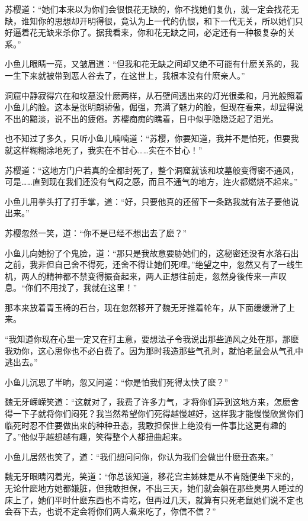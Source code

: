 \documentclass[12pt,oneside]{book}
\begin{document}
苏樱道：``她们本来以为你们会很恨花无缺的，你不找她们复仇，就一定会找花无缺，谁知你的思想却开明得很，竟认为上一代的仇恨，和下一代无关，所以她们只好逼着花无缺来杀你了。据我看来，你和花无缺之间，必定还有一种极复杂的关系。''

小鱼儿眼睛一亮，又皱眉道：``但我和花无缺之间却又绝不可能有什麽关系的，我一生下来就被带到恶人谷去了，在这世上，我根本没有什麽亲人。''

洞窟中静寂得穴在和坟墓没什麽两样，从石壁间透出来的灯光很柔和，月光般照着小鱼儿的脸。这本是张明朗骄傲，倔强，充满了魅力的脸，但现在看来，却显得说不出的黯淡，说不出的疲倦。苏樱痴痴的瞧着，目中似乎隐隐泛起了泪光。

也不知过了多久，只听小鱼儿喃喃道：``苏樱，你要知道，我并不是怕死，但要我就这样糊糊涂地死了，我实在不甘心\ldots\ldots 实在不甘心！''

苏樱道：``这地方门户若真的全都封死了，整个洞窟就该和坟墓般变得密不通风，可是\ldots\ldots 直到现在我们还没有气闷之感，而且不通气的地方，连火都燃烧不起来。''

小鱼儿用拳头打了打手掌，道：``好，只要他真的还留下一条路我就有法子要他说出来。''

苏樱忽然一笑，道：``你不是已经不想出去了麽？''

小鱼儿向她扮了个鬼脸，道：``那只是我故意要胁她们的，这秘密还没有水落石出之前，我非但自己舍不得死，还舍不得让她们死哩。''绝望之中，忽然又有了一线生机，两人的精神都不禁变得振奋起来，两人正想往前走，忽然身後传来一声叹息。``你们不用找了，我就在这里！''

那本来放着青玉椅的石台，现在忽然移开了魏无牙推着轮车，从下面缓缓滑了上来。

``我知道你现在心里一定又在打主意，要想法子令我说出那些通风之处在那，那麽我劝你，这心思你也不必白费了。因为那时我造那些气孔时，就怕老鼠会从气孔中逃出去。''

小鱼儿沉思了半晌，忽又问道：``你是怕我们死得太快了麽？''

魏无牙嵘嵘笑道：``这就对了，我费了许多力气，才将你们弄到这地方来，怎麽舍得一下子就将你们闷死？我当然希望你们死得越慢越好，这样我才能慢慢欣赏你们临死时忍不住要做出来的种种丑态，我敢担保世上绝没有一件事比这更有趣的了。''他似乎越想越有趣，笑得整个人都扭曲起来。

小鱼儿居然也笑了，道：``我们想问问你，你认为我们会做出什麽丑态来。''

魏无牙眼睛闪着光，笑道：``你总该知道，移花宫主姊妹是从不肯随便坐下来的，无论什麽地方她都嫌脏，但我敢担保，不出三天，她们就会躺在那些臭男人睡过的床上了，她们平时什麽东西也不肯吃，但再过几天，就算有只死老鼠她们说不定也会吞下去，也说不定会将你们两人煮来吃了，你信不信？''
\end{document}
